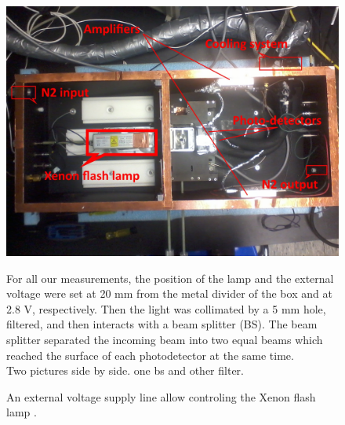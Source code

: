 \documentclass[a4paper, 11pt]{report}%
\newcommand{\xfl}{Xenon flash lamp }
\begin{document}
  \begin{figure}[!hbtp]
  \centering
  \includegraphics[totalheight=.35\textwidth,trim=0cm 7cm 0cm 2.5cm, clip=true,]{../Pictures/blabla/box.jpg}%
  \caption{An external voltage supply line allow controling the \xfl.}
  \label{fig:external_supply_line}

  For all our measurements, the position of the lamp and the external voltage were set at 20 mm from the metal divider of the box and at 2.8 V, respectively.
  Then the light was collimated by a 5 mm hole, filtered, and then interacts with a beam splitter (BS). The beam splitter separated the 
  incoming beam into two 
  equal beams which reached the surface of each photodetector at the same time. 
  \\
  Two pictures side by side. one bs and other filter.  
  

\end{figure}
\end{document}
